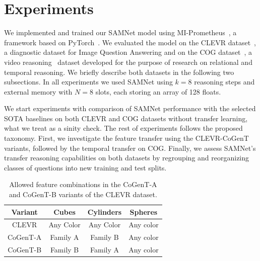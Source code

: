 \section{Experiments}
\label{sec:experiments}

We implemented and trained our SAMNet model using MI-Prometheus~\cite{kornuta2018accelerating}, a framework based on PyTorch~\cite{paszke2017automatic}.
We evaluated the model on 
the CLEVR dataset~\cite{johnson2017clevr}, a diagnostic dataset for Image Question Answering and on the COG dataset~\cite{yang2018dataset}, a video reasoning~\cite{mogadala2019trends} dataset developed for the purpose of research on relational and temporal reasoning.
We briefly describe both datasets in the following two subsections.
In all experiments we used SAMNet using $k = 8$ reasoning steps and external memory with $N = 8$ slots, each storing an array of 128 floats. 

We start experiments with comparison of SAMNet performance with the selected SOTA baselines on both CLEVR and COG datasets without transfer learning, what we treat as a sinity check.
The rest of experiments follows the proposed taxonomy.
First, we investigate the feature transfer using the CLEVR-CoGenT variants, followed by the temporal transfer on COG. Finally, we assess SAMNet's transfer reasoning capabilities on both datasets by regrouping and reorganizing classes of questions into new training and test splits.

\begin{table}[b!]
	\centering
	\begin{tabular}{cccc}
		\toprule
		Variant	& Cubes	& Cylinders &	Spheres	\\
		\midrule
		CLEVR &  Any Color  & Any Color 	&	Any color  \\
		CoGenT-A &  Family A  & Family B 	&	Any color  \\
		CoGenT-B	&	Family B  &	Family A	&	Any color \\
		\bottomrule
	\end{tabular}
	\caption{Allowed feature combinations in the CoGenT-A and CoGenT-B variants of the CLEVR dataset.}%
	\label{tab:cogent_conditions}
\end{table}

